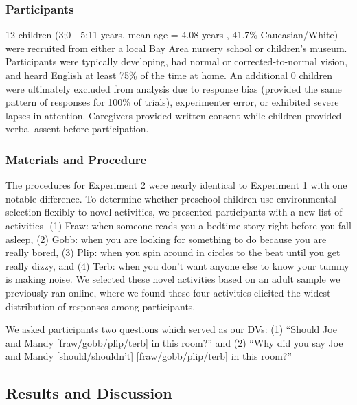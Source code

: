 \documentclass[10pt, letterpaper]{article}
\begin{document}
\hypertarget{participants-1}{%
\subsubsection{Participants}\label{participants-1}}

12 children (3;0 - 5;11 years, mean age = 4.08 years , 41.7\%
Caucasian/White) were recruited from either a local Bay Area nursery
school or children's museum. Participants were typically developing, had
normal or corrected-to-normal vision, and heard English at least 75\% of
the time at home. An additional 0 children were ultimately excluded from
analysis due to response bias (provided the same pattern of responses
for 100\% of trials), experimenter error, or exhibited severe lapses in
attention. Caregivers provided written consent while children provided
verbal assent before participation.

\hypertarget{materials-and-procedure-1}{%
\subsubsection{Materials and
Procedure}\label{materials-and-procedure-1}}

The procedures for Experiment 2 were nearly identical to Experiment 1
with one notable difference. To determine whether preschool children use
environmental selection flexibly to novel activities, we presented
participants with a new list of activities- (1) Fraw: when someone reads
you a bedtime story right before you fall asleep, (2) Gobb: when you are
looking for something to do because you are really bored, (3) Plip: when
you spin around in circles to the beat until you get really dizzy, and
(4) Terb: when you don't want anyone else to know your tummy is making
noise. We selected these novel activities based on an adult sample we
previously ran online, where we found these four activities elicited the
widest distribution of responses among participants.

We asked participants two questions which served as our DVs: (1)
``Should Joe and Mandy {[}fraw/gobb/plip/terb{]} in this room?'' and (2)
``Why did you say Joe and Mandy {[}should/shouldn't{]}
{[}fraw/gobb/plip/terb{]} in this room?''

\hypertarget{results-and-discussion-1}{%
\subsection{Results and Discussion}\label{results-and-discussion-1}}
\end{document}
